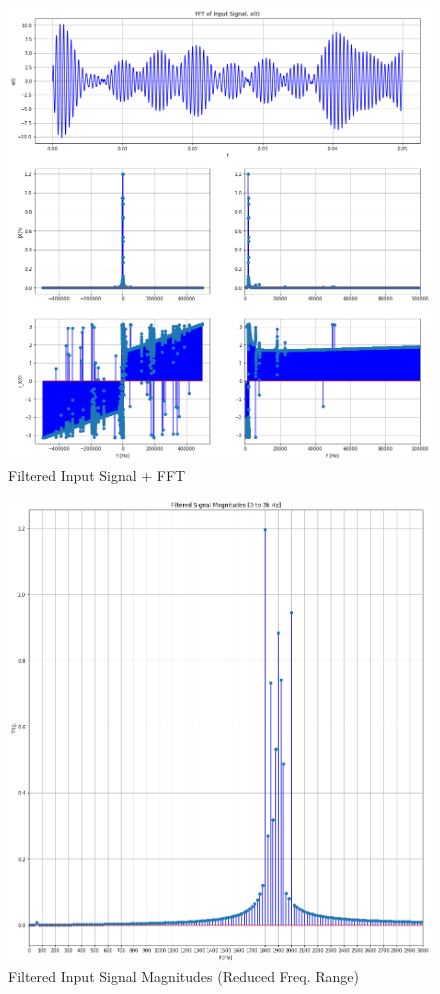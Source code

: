 \documentclass[12pt]{report}
\begin{document}
\begin{figure}[h!]
  \centering
  \includegraphics[width=\linewidth]{FISFFT.png}
  \caption{Filtered Input Signal + FFT}
  \label{fig: FISFFT}
\end{figure}
\begin{figure}[h!]
  \centering
  \includegraphics[width=\linewidth]{FISM.png}
  \caption{Filtered Input Signal Magnitudes (Reduced Freq. Range)}
  \label{fig: FISM}
\end{figure}
\end{document}
